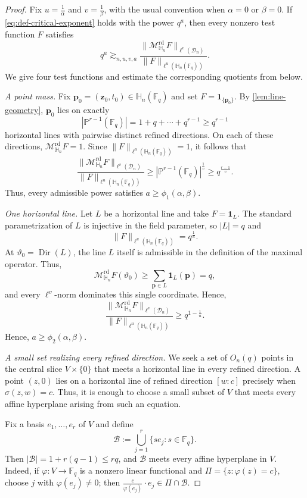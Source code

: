 \documentclass[11pt,letterpaper]{amsart}
\numberwithin{equation}{section}
\theoremstyle{definition}
\theoremstyle{remark}
\newcommand{\Fq}{\mathbb F_q}
\newcommand{\PP}{\mathbb P}
\newcommand{\HH}{\mathbb H}
\newcommand{\Dn}{\mathcal D_n}
\newcommand{\Mrd}{\mathcal M^{\mathrm{rd}}_{\HH_n}}
\newcommand{\one}{\mathbf 1}
\newcommand{\norm}[1]{\lVert #1\rVert}
\newcommand{\Dir}{\operatorname{Dir}}
\begin{document}
\begin{proof}
Fix $u=\frac{1}{\alpha}$ and $v=\frac{1}{\beta}$, with the usual convention when $\alpha=0$ or $\beta=0$. If \eqref{eq:def-critical-exponent} holds with the power $q^a$, then every nonzero test function $F$ satisfies
\begin{equation}\label{eq:test-function-principle}
 q^a
 \gtrsim_{n,u,v,a}
 \frac{\norm{\Mrd F}_{\ell^v(\Dn)}}
      {\norm{F}_{\ell^u(\HH_n(\Fq))}}.
\end{equation}
We give four test functions and estimate the corresponding quotients from below.

\emph{A point mass.}
Fix $\mathbf{p}_0=(\mathbf{z}_0,t_0)\in\HH_n(\Fq)$ and set
$F=\one_{\{\mathbf{p}_0\}}$.  By \cref{lem:line-geometry},
$\mathbf{p}_0$ lies on exactly
\[
 |\PP^{r-1}(\Fq)|=1+q+\cdots+q^{r-1} \geq q^{r-1}
\]
horizontal lines with pairwise distinct refined directions. On each of these directions, $\Mrd F=1$. Since $\norm{F}_{\ell^u(\HH_n(\Fq))}=1$, it follows that
\[
 \frac{\norm{\Mrd F}_{\ell^v(\Dn)}}
      {\norm{F}_{\ell^u(\HH_n(\Fq))}}
 \geq |\PP^{r-1}(\Fq)|^{\frac{1}{v}}
 \geq q^{\frac{r-1}{v}}.
\]
Thus, every admissible power satisfies $a\geq\phi_1(\alpha,\beta)$.

\emph{One horizontal line.}
Let $L$ be a horizontal line and take $F=\one_L$. The standard
parametrization of $L$ is injective in the field parameter, so $|L|=q$
and
\[
 \norm{F}_{\ell^u(\HH_n(\Fq))}=q^{\frac{1}{u}}.
\]
At $\vartheta_0=\Dir(L)$, the line $L$ itself is admissible in the
definition of the maximal operator. Thus,
\[
 \Mrd F(\vartheta_0)
 \geq\sum_{\mathbf{p}\in L}\one_L(\mathbf{p})
 =q,
\]
and every $\ell^v$-norm dominates this single coordinate. Hence,
\[
 \frac{\norm{\Mrd F}_{\ell^v(\Dn)}}
      {\norm{F}_{\ell^u(\HH_n(\Fq))}}
 \geq q^{1-\frac{1}{u}}.
\]
Hence, $a\geq\phi_2(\alpha,\beta)$.



\emph{A small set realizing every refined direction.}
We seek a set of $O_n(q)$ points in the central slice $V\times\{0\}$ that meets a horizontal line in every refined direction. A point $(z,0)$ lies on a horizontal line of refined direction $[w:c]$ precisely when $\sigma(z, w)=c$. Thus, it is enough to choose a small subset of $V$ that meets every affine hyperplane arising from such an equation.

Fix a basis $e_1,\ldots,e_r$ of $V$ and define
\begin{equation}\label{eq:axes-set}
 \mathcal B
 :=
 \bigcup_{j=1}^r
 \{s e_j:s\in\Fq\}.
\end{equation}
Then $|\mathcal B|=1+r(q-1) \leq r q$, and $\mathcal B$ meets every affine hyperplane in $V$. Indeed, if $\varphi:V\to\Fq$ is a nonzero linear functional and $\Pi=\{z:\varphi(z)=c\}$, choose $j$ with
$\varphi(e_j)\neq 0$; then
$\frac{c}{\varphi(e_j)} \cdot e_j\in\Pi\cap\mathcal B$.


\end{proof}
\end{document}
